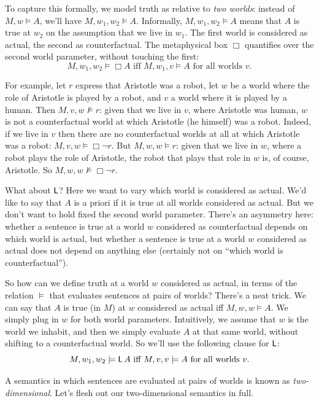 To capture this formally,
we model truth as relative to \emph{two worlds}:
instead of $M, w \models A$,
we'll have $M, w_{1},w_{2} \models A$.
Informally, $M, w_{1},w_{2} \models A$ means that $A$ is true at $w_{2}$ on the assumption that we live in $w_{1}$.
The first world is considered as actual, the second as counterfactual.
The metaphysical box $\Box$ quantifies over the second world parameter,
without touching the first:
\[
  M,w_{1},w_{2} \models \Box A \text{ iff } M, w_{1},v \models A \text{ for all worlds $v$}.
\]

For example, let $r$ express that Aristotle was a robot,
let $w$ be a world where the role of Aristotle is played by a robot,
and $v$ a world where it is played by a human.
Then $M,v,w \not\models r$:
given that we live in $v$, where Aristotle was human,
$w$ is not a counterfactual world at which Aristotle (he himself) was a robot.
Indeed, if we live in $v$ then
there are no counterfactual worlds at all at which Aristotle was a robot:
$M,v,w \models \Box \neg r$.
But $M,w,w \models r$:
given that we live in $w$, where a robot plays the role of Aristotle,
the robot that plays that role in $w$ is, of course, Aristotle.
So $M,w,w \not\models \Box \neg r$.

What about $\operatorname{\mathsf{L}}$?
Here we want to vary which world is considered as actual.
We'd like to say that $A$ is a priori if it is true at all worlds considered as actual.
But we don't want to hold fixed the second world parameter.
There's an asymmetry here:
whether a sentence is true at a world $w$ considered as counterfactual depends on which world is actual,
but whether a sentence is true at a world $w$ considered as actual does not depend on anything else
(certainly not on ``which world is counterfactual'').

So how can we define truth at a world $w$ considered as actual, in terms of
the relation $\models$ that evaluates sentences at pairs of worlds?
There's a neat trick.
We can say that $A$ is true (in $M$) at $w$ considered as actual iff $M, w,w \models A$.
We simply plug in $w$ for both world parameters.
Intuitively,
we assume that $w$ is the world we inhabit,
and then we simply evaluate $A$ at that same world,
without shifting to a counterfactual world.
So we'll use the following clause for $\operatorname{\mathsf{L}}$:
\[
  M,w_{1},w_{2} \models \apriori A \text{ iff } M,v,v \models A \text{ for all worlds $v$}.
\]

A semantics in which sentences are evaluated at pairs of worlds is known as \emph{two-dimensional}.
Let's flesh out our two-dimensional semantics in full.

